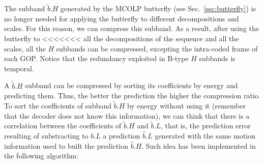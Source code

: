 The subband $\tilde{b}.H$ generated by the MCOLP butterfly (see
Sec.~\ref{sec:butterfly}) is no longer needed for applying the
butterfly to different decompositions and scales. For this reason, we
can compress this subband. As a result, after using the butterfly to
<<<<<<< all the decompositions of the sequence and all the scales, all the $H$
subbands can be compressed, excepting the intra-coded frame of each
GOP. Notice that the redundancy exploited in B-type $H$ subbands is
temporal.

A $\tilde{b}.H$ subband can be compressed by sorting its coefficients
by energy and predicting them. Thus, the better the prediction the
higher the compression ratio. To sort the coefficients of subband
$\tilde{b}.H$ by energy without using it (remember that the decoder
does not know this information), we can think that there is a
correlation between the coefficients of $\tilde{b}.H$ and
$\tilde{b}.L$, that is, the prediction error resulting of substracting
to $b.L$ a prediction $\hat{b}.L$ generated with the same motion
information used to built the prediction $\hat{b}.H$. Such idea has
been implemented in the following algorithm:

